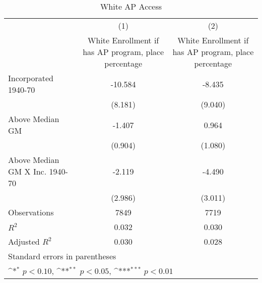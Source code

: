\begin{table}[htbp]\centering
\def\sym#1{\ifmmode^{#1}\else\(^{#1}\)\fi}
\caption{White AP Access}
\begin{tabular}{l*{2}{c}}
\hline\hline
                    &\multicolumn{1}{c}{(1)}&\multicolumn{1}{c}{(2)}\\
                    &\multicolumn{1}{c}{White Enrollment if has AP program, place percentage}&\multicolumn{1}{c}{White Enrollment if has AP program, place percentage}\\
\hline
Incorporated 1940-70&     -10.584         &      -8.435         \\
                    &     (8.181)         &     (9.040)         \\
[1em]
Above Median GM     &      -1.407         &       0.964         \\
                    &     (0.904)         &     (1.080)         \\
[1em]
Above Median GM X Inc. 1940-70&      -2.119         &      -4.490         \\
                    &     (2.986)         &     (3.011)         \\
\hline
Observations        &        7849         &        7719         \\
\(R^{2}\)           &       0.032         &       0.030         \\
Adjusted \(R^{2}\)  &       0.030         &       0.028         \\
\hline\hline
\multicolumn{3}{l}{\footnotesize Standard errors in parentheses}\\
\multicolumn{3}{l}{\footnotesize \sym{*} \(p<0.10\), \sym{**} \(p<0.05\), \sym{***} \(p<0.01\)}\\
\end{tabular}
\end{table}
